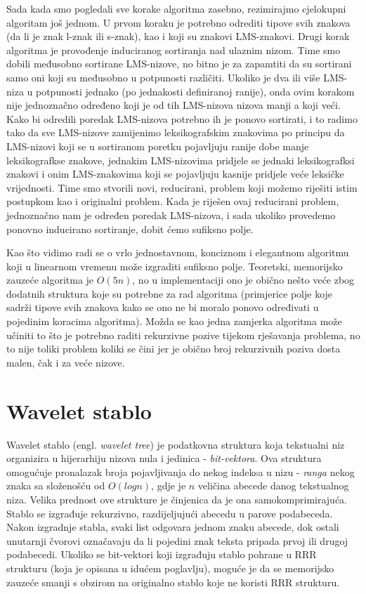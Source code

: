 Sada kada smo pogledali sve korake algoritma zasebno, rezimirajmo cjelokupni algoritam još jednom. U prvom koraku je potrebno odrediti tipove svih znakova (da li je znak l-znak ili s-znak), kao i koji su znakovi LMS-znakovi. Drugi korak algoritma je provođenje induciranog sortiranja nad ulaznim nizom. Time smo dobili međusobno sortirane LMS-nizove, no bitno je za zapamtiti da su sortirani samo oni koji su međusobno u potpunosti različiti. Ukoliko je dva ili više LMS-niza u potpunosti jednako (po jednakosti definiranoj ranije), onda ovim korakom nije jednoznačno određeno koji je od tih LMS-nizova nizova manji a koji veći. Kako bi odredili poredak LMS-nizova potrebno ih je ponovo sortirati, i to radimo tako da sve LMS-nizove zamijenimo leksikografskim znakovima po principu da LMS-nizovi koji se u sortiranom poretku pojavljuju ranije dobe manje leksikografkse znakove, jednakim LMS-nizovima pridjele se jednaki leksikografksi znakovi i onim LMS-znakovima koji se pojavljuju kasnije pridjele veće leksičke vrijednosti. Time smo stvorili novi, reducirani, problem koji možemo riješiti istim postupkom kao i originalni problem. Kada je riješen ovaj reducirani problem, jednoznačno nam je određen poredak LMS-nizova, i sada ukoliko provedemo ponovno inducirano sortiranje, dobit ćemo sufiksno polje.


Kao što vidimo radi se o vrlo jednostavnom, konciznom i elegantnom algoritmu koji u linearnom vremenu može izgraditi sufiksno polje. Teoretski, memorijsko zauzeće algoritma je $O(5n)$, no u implementaciji ono je obično nešto veće zbog dodatnih struktura koje su potrebne za rad algoritma (primjerice polje koje sadrži tipove svih znakova kako se ono ne bi moralo ponovo određivati u pojedinim koracima algoritma). Možda se kao jedna zamjerka algoritma može učiniti to što je potrebno raditi rekurzivne pozive tijekom rješavanja problema, no to nije toliki problem koliki se čini jer je obično broj rekurzivnih poziva dosta malen, čak i za veće nizove.


\section{Wavelet stablo}

Wavelet stablo (engl. \textit{wavelet tree}) je podatkovna struktura koja tekstualni niz organizira u hijerarhiju nizova nula i jedinica - \textit{bit-vektora}. Ova struktura omogućuje pronalazak broja pojavljivanja do nekog indeksa u nizu - \textit{ranga} nekog znaka sa složenošću od $O(log n)$, gdje je $n$ veličina abecede danog tekstualnog niza. Velika prednost ove strukture je činjenica da je ona samokomprimirajuća.\\
Stablo se izgrađuje rekurzivno, razdijeljujući abecedu u parove podabeceda. Nakon izgradnje stabla, svaki list odgovara jednom znaku abecede, dok ostali unutarnji čvorovi označavaju da li pojedini znak teksta pripada prvoj ili drugoj podabecedi.
Ukoliko se bit-vektori koji izgrađuju stablo pohrane u RRR strukturu (koja je opisana u idućem poglavlju), moguće je da se memorijsko zauzeće smanji s obzirom na originalno stablo koje ne koristi RRR strukturu.


